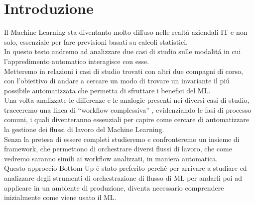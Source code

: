 \documentclass[../tesi.tex]{subfiles}
\begin{document}
\chapter{Introduzione}

Il Machine Learning sta diventanto molto diffuso nelle realtá aziendali IT e non solo, essenziale per fare previsioni basati su calcoli statistici.\\
In questo testo andremo ad analizzare due casi di studio sulle modalitá in cui l’appredimento automatico  interagisce con esse.\\
Metteremo in relazioni i casi di studio trovati con altri due compagni di corso, con l’obiettivo di andare a cercare un modo di trovare un invariante il piú possibile automatizzata che permetta di sfruttare i benefici del ML.\\
Una volta analizzate le differenze e le analogie presenti nei diversi casi di studio, tracceremo una linea di ``workflow complessiva” , evidenziando le fasi di processo comuni, i quali diventeranno essenziali per capire come cercare di automatizzare la gestione dei flussi di lavoro del Machine Learning.\\
Senza la pretesa di essere completi studieremo e confronteremo un insieme di \Gls{framework}, che permettono di orchestrare diversi flussi di lavoro, che come vedremo saranno simili ai workflow analizzati, in maniera automatica.\\
Questo approccio Bottom-Up é stato preferito perché per arrivare a studiare ed analizzare degli strumenti di orchestrazione di flusso di ML per andarli poi ad applicare in un ambiente di produzione, diventa necessario comprendere inizialmente come viene usato il ML.
\newpage
\end{document}
